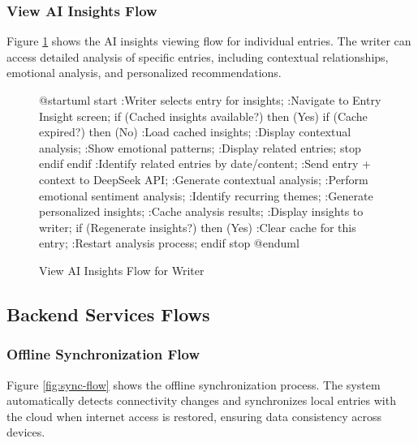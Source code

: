 \subsubsection{View AI Insights Flow}\label{subsubsec:insightsFlow}

Figure \ref{fig:insights-flow} shows the AI insights viewing flow for individual entries. The writer can access detailed analysis of specific entries, including contextual relationships, emotional analysis, and personalized recommendations.

\begin{figure}[H]
\centering
\begin{plantuml}
@startuml
start
:Writer selects entry for insights;
:Navigate to Entry Insight screen;
if (Cached insights available?) then (Yes)
  if (Cache expired?) then (No)
    :Load cached insights;
    :Display contextual analysis;
    :Show emotional patterns;
    :Display related entries;
    stop
  endif
endif
:Identify related entries by date/content;
:Send entry + context to DeepSeek API;
:Generate contextual analysis;
:Perform emotional sentiment analysis;
:Identify recurring themes;
:Generate personalized insights;
:Cache analysis results;
:Display insights to writer;
if (Regenerate insights?) then (Yes)
  :Clear cache for this entry;
  :Restart analysis process;
endif
stop
@enduml
\end{plantuml}
\caption{View AI Insights Flow for Writer}
\label{fig:insights-flow}
\end{figure}

\subsection{Backend Services Flows}\label{subsec:backendFlows}

\subsubsection{Offline Synchronization Flow}\label{subsubsec:syncFlow}

Figure \ref{fig:sync-flow} shows the offline synchronization process. The system automatically detects connectivity changes and synchronizes local entries with the cloud when internet access is restored, ensuring data consistency across devices.

